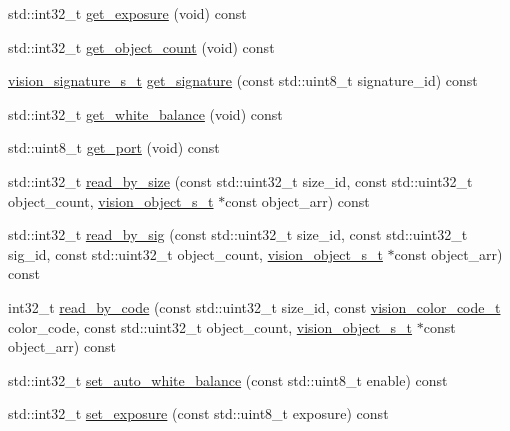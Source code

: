 \begin{DoxyCompactItemize}
\item 
std\+::int32\+\_\+t \hyperlink{classpros_1_1Vision_a80552b2897b8edcdb68bc56477213f2e}{get\+\_\+exposure} (void) const
\item 
std\+::int32\+\_\+t \hyperlink{classpros_1_1Vision_a73869f85b3d2e468ffc51957d80f5a75}{get\+\_\+object\+\_\+count} (void) const
\item 
\hyperlink{vision_8h_a135c729c7277f6cc019c2924088a5fd5}{vision\+\_\+signature\+\_\+s\+\_\+t} \hyperlink{classpros_1_1Vision_af1d1bc18fd7dacfd23d9dfc403b7d419}{get\+\_\+signature} (const std\+::uint8\+\_\+t signature\+\_\+id) const
\item 
std\+::int32\+\_\+t \hyperlink{classpros_1_1Vision_a7a89ad6812bfd46e24e69e1dc2f55039}{get\+\_\+white\+\_\+balance} (void) const
\item 
std\+::uint8\+\_\+t \hyperlink{classpros_1_1Vision_af9958688590139df7b1227765f63d5ce}{get\+\_\+port} (void) const
\item 
std\+::int32\+\_\+t \hyperlink{classpros_1_1Vision_adb2a3e6a7c483cda5a32a341d5be0cc6}{read\+\_\+by\+\_\+size} (const std\+::uint32\+\_\+t size\+\_\+id, const std\+::uint32\+\_\+t object\+\_\+count, \hyperlink{vision_8h_ae619120558539c13e53b5a6f42fb4375}{vision\+\_\+object\+\_\+s\+\_\+t} $\ast$const object\+\_\+arr) const
\item 
std\+::int32\+\_\+t \hyperlink{classpros_1_1Vision_af5bb50d41d63d6ff9cf4f6a642046fca}{read\+\_\+by\+\_\+sig} (const std\+::uint32\+\_\+t size\+\_\+id, const std\+::uint32\+\_\+t sig\+\_\+id, const std\+::uint32\+\_\+t object\+\_\+count, \hyperlink{vision_8h_ae619120558539c13e53b5a6f42fb4375}{vision\+\_\+object\+\_\+s\+\_\+t} $\ast$const object\+\_\+arr) const
\item 
int32\+\_\+t \hyperlink{classpros_1_1Vision_afbe909146f5cf396b322467885731d04}{read\+\_\+by\+\_\+code} (const std\+::uint32\+\_\+t size\+\_\+id, const \hyperlink{vision_8h_a71f2011a47e95558bb534b05c16c7f2b}{vision\+\_\+color\+\_\+code\+\_\+t} color\+\_\+code, const std\+::uint32\+\_\+t object\+\_\+count, \hyperlink{vision_8h_ae619120558539c13e53b5a6f42fb4375}{vision\+\_\+object\+\_\+s\+\_\+t} $\ast$const object\+\_\+arr) const
\item 
std\+::int32\+\_\+t \hyperlink{classpros_1_1Vision_a19cf2d7cf34b763b80da2c6511a61a49}{set\+\_\+auto\+\_\+white\+\_\+balance} (const std\+::uint8\+\_\+t enable) const
\item 
std\+::int32\+\_\+t \hyperlink{classpros_1_1Vision_a2ad6faaad1abb936f52022022611ac7f}{set\+\_\+exposure} (const std\+::uint8\+\_\+t exposure) const

\end{DoxyCompactItemize}

